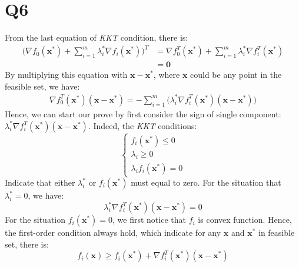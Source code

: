 \documentclass[10pt,a4paper]{article}
\begin{document}
\section*{Q6}
From the last equation of \textit{KKT} condition, there is:
\begin{equation}
	\begin{aligned}
		\Big( \nabla f_{0}(\mathbf{x}^{*}) + \displaystyle\sum_{i = 1}^{m} \lambda_{i}^{*} \nabla f_{i}(\mathbf{x}^{*}) \Big)^{T} &= \nabla f_{0}^{T}(\mathbf{x}^{*}) +  \displaystyle\sum_{i = 1}^{m} \lambda_{i}^{*} \nabla f_{i}^{T}(\mathbf{x}^{*}) \\
		&= \mathbf{0}
	\end{aligned}
\end{equation}
By multiplying this equation with $\mathbf{x} - \mathbf{x}^{*}$, where $\mathbf{x}$ could be any point in the feasible set, we have:
\begin{equation}
	\begin{aligned}
		\nabla f_{0}^{T}(\mathbf{x}^{*}) (\mathbf{x} - \mathbf{x}^{*}) = -\displaystyle\sum_{i = 1}^{m} \Big( \lambda_{i}^{*} \nabla f_{i}^{T}(\mathbf{x}^{*}) (\mathbf{x} - \mathbf{x}^{*}) \Big)
	\end{aligned}
\end{equation}
Hence, we can start our prove by first consider the sign of single component: $\lambda_{i}^{*} \nabla f_{i}^{T}(\mathbf{x}^{*}) (\mathbf{x} - \mathbf{x}^{*})$. Indeed, the \textit{KKT} conditions:
\begin{equation}
	\begin{cases}
		f_{i}(\mathbf{x}^{*}) \leq 0 \\
		\lambda_{i} \geq 0 \\
		\lambda_{i} f_{i}(\mathbf{x}^{*}) = 0
	\end{cases}
\end{equation}
Indicate that either $\lambda_{i}^{*}$ or $f_{i}(\mathbf{x}^{*})$ must equal to zero. For the situation that $\lambda_{i}^{*} = 0$, we have:
\begin{equation}
	\lambda_{i}^{*} \nabla f_{i}^{T}(\mathbf{x}^{*}) (\mathbf{x} - \mathbf{x}^{*}) = 0
	\label{c_1}
\end{equation}
For the situation $f_{i}(\mathbf{x}^{*}) = 0$, we first notice that $f_{i}$ is convex function. Hence, the first-order condition always hold, which indicate for any $\mathbf{x}$ and $\mathbf{x}^{*}$ in feasible set, there is:
\begin{equation}
	f_{i}(\mathbf{x}) \geq f_{i}(\mathbf{x}^{*}) + \nabla f_{i}^{T}(\mathbf{x}^{*})(\mathbf{x} - \mathbf{x}^{*})
\end{equation}
\end{document}
